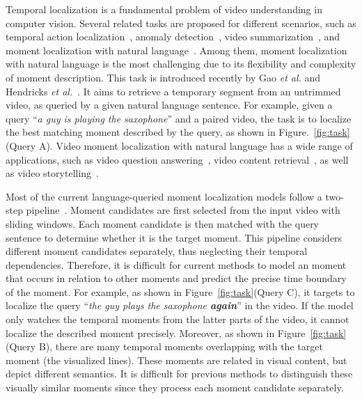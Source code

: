 \documentclass[letterpaper]{article} %
\begin{document}
Temporal localization is a fundamental problem of video understanding in computer vision.
Several related tasks are proposed for different scenarios, such as temporal action localization~\cite{SSN2017ICCV}, anomaly detection~\cite{hasan2016learning}, video summarization~\cite{song2015tvsum,chu2015video}, and moment localization with natural language~\cite{gao2017tall,hendricks17iccv}.
Among them, moment localization with natural language is the most challenging due to its flexibility and complexity of moment description.
This task is introduced recently by Gao \textit{et al.} and Hendricks \textit{et al.}~\cite{hendricks17iccv,gao2017tall}.
It aims to retrieve a temporary segment from an untrimmed video, as queried by a given natural language sentence.
For example, given a query ``\textit{a guy is playing the saxophone}'' and a paired video, the task is to localize the best matching moment described by the query, as shown in Figure.~\ref{fig:task}(Query A). Video moment localization with natural language has a wide range of applications, such as video question answering~\cite{lei2018tvqa}, video content retrieval~\cite{Shao_2018_ECCV}, as well as video storytelling~\cite{gella2018dataset}.


Most of the current language-queried moment localization models follow a two-step pipeline~\cite{gao2017tall,hendricks17iccv,Ge_2019_WACV,liu2018attentive,song2018val}.
Moment candidates are first selected from the input video with sliding windows. Each moment candidate is then matched with the query sentence to determine whether it is the target moment. 
This pipeline considers different moment candidates separately, thus neglecting their temporal dependencies. Therefore, it is difficult for current methods to model an moment that occurs in relation to other moments and predict the precise time boundary of the moment. For example, as shown in Figure~\ref{fig:task}(Query C), it targets to localize the query ``\textit{the guy plays the saxophone \textbf{again}}'' in the video. If the model only watches the temporal moments from the latter parts of the video, it cannot localize the described moment precisely.
Moreover, as shown in Figure~\ref{fig:task}(Query B), there are many temporal moments overlapping with the target moment (the visualized lines). 
These moments are related in visual content, but depict different semantics. It is difficult for previous methods to distinguish these visually similar moments since they process each moment candidate separately.
\end{document}

